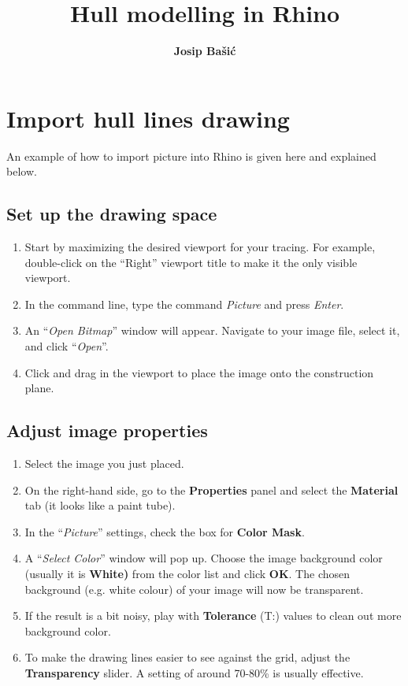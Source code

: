 \documentclass{article}
\title{Hull modelling in Rhino}
\date{\displaydate{articleDate}}
\author{\bfseries Josip Bašić\mdseries\\}
\begin{document}
\maketitle
\keywords{}

\section{Import hull lines drawing}

An example of how to import picture into Rhino is given here and explained below.

\subsection{Set up the drawing space}

\begin{enumerate}
\item Start by maximizing the desired viewport for your tracing. For example, double-click on the ``Right'' viewport title to make it the only visible viewport.
\item In the command line, type the command \textit{Picture} and press \textit{Enter}.
\item An ``\textit{Open Bitmap}'' window will appear. Navigate to your image file, select it, and click ``\textit{Open}''.
\item Click and drag in the viewport to place the image onto the construction plane.
\end{enumerate}

\subsection{Adjust image properties}

\begin{enumerate}
\item Select the image you just placed.
\item On the right-hand side, go to the \textbf{Properties} panel and select the \textbf{Material} tab (it looks like a paint tube).
\item In the ``\textit{Picture}'' settings, check the box for \textbf{Color Mask}.
\item A ``\textit{Select Color}'' window will pop up. Choose the image background color (usually it is \textbf{White)} from the color list and click \textbf{OK}. The chosen background (e.g. white colour) of your image will now be transparent.
\item If the result is a bit noisy, play with \textbf{Tolerance} (T:) values to clean out more background color.
\item To make the drawing lines easier to see against the grid, adjust the \textbf{Transparency} slider. A setting of around 70-80\% is usually effective.
\end{enumerate}
\end{document}
